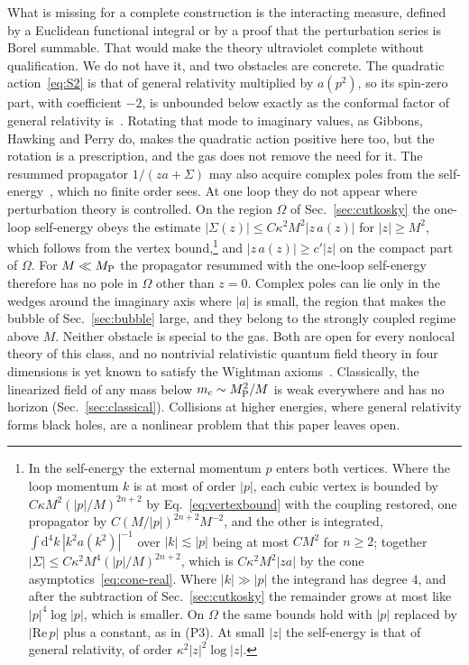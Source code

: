\documentclass[aps,prd,10pt,twocolumn,superscriptaddress,nofootinbib,floatfix,longbibliography]{revtex4-2}
\newcommand{\dd}{\mathrm{d}}
\begin{document}
What is missing for a complete construction is the interacting measure, defined by a Euclidean functional integral or by a proof that the perturbation series is Borel summable. That would make the theory ultraviolet complete without qualification. We do not have it, and two obstacles are concrete. The quadratic action~\eqref{eq:S2} is that of general relativity multiplied by $a(p^2)$, so its spin-zero part, with coefficient $-2$, is unbounded below exactly as the conformal factor of general relativity is~\cite{GibbonsHawkingPerry1978}. Rotating that mode to imaginary values, as Gibbons, Hawking and Perry do, makes the quadratic action positive here too, but the rotation is a prescription, and the gas does not remove the need for it. The resummed propagator $1/(za+\Sigma)$ may also acquire complex poles from the self-energy~\cite{Shapiro2015}, which no finite order sees. At one loop they do not appear where perturbation theory is controlled. On the region $\Omega$ of Sec.~\ref{sec:cutkosky} the one-loop self-energy obeys the estimate $|\Sigma(z)|\le C\kappa^2M^2|z\,a(z)|$ for $|z|\ge M^2$, which follows from the vertex bound,\footnote{In the self-energy the external momentum $p$ enters both vertices. Where the loop momentum $k$ is at most of order $|p|$, each cubic vertex is bounded by $C\kappa M^2(|p|/M)^{2n+2}$ by Eq.~\eqref{eq:vertexbound} with the coupling restored, one propagator by $C(M/|p|)^{2n+2}M^{-2}$, and the other is integrated, $\int\dd^4k\,|k^2a(k^2)|^{-1}$ over $|k|\lesssim|p|$ being at most $CM^2$ for $n\ge2$; together $|\Sigma|\le C\kappa^2M^4(|p|/M)^{2n+2}$, which is $C\kappa^2M^2|za|$ by the cone asymptotics~\eqref{eq:cone-real}. Where $|k|\gg|p|$ the integrand has degree $4$, and after the subtraction of Sec.~\ref{sec:cutkosky} the remainder grows at most like $|p|^4\log|p|$, which is smaller. On $\Omega$ the same bounds hold with $|p|$ replaced by $|\mathrm{Re}\,p|$ plus a constant, as in (P3). At small $|z|$ the self-energy is that of general relativity, of order $\kappa^2|z|^2\log|z|$.} and $|z\,a(z)|\ge c'|z|$ on the compact part of $\Omega$. For $M\ll M_{\rm P}$ the propagator resummed with the one-loop self-energy therefore has no pole in $\Omega$ other than $z=0$. Complex poles can lie only in the wedges around the imaginary axis where $|a|$ is small, the region that makes the bubble of Sec.~\ref{sec:bubble} large, and they belong to the strongly coupled regime above $M$. Neither obstacle is special to the gas. Both are open for every nonlocal theory of this class, and no nontrivial relativistic quantum field theory in four dimensions is yet known to satisfy the Wightman axioms~\cite{JaffeWitten2006}. Classically, the linearized field of any mass below $m_c\sim M_{\rm P}^2/M$ is weak everywhere and has no horizon (Sec.~\ref{sec:classical}). Collisions at higher energies, where general relativity forms black holes, are a nonlinear problem that this paper leaves open.
\end{document}
